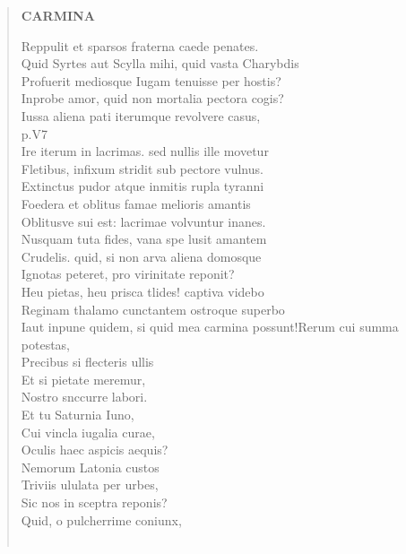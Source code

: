 \documentclass[11pt, a4paper]{report}
\begin{document}
\begin{verse}
    \begin{center} \textbf{CARMINA} \end{center} \marginpar{[62]} Reppulit et sparsos fraterna caede penates. \\ Quid Syrtes aut Scylla mihi, quid vasta Charybdis \\ Profuerit mediosque Iugam tenuisse per hostis? \\ Inprobe amor, quid non mortalia  \lbrack pectora \rbrack  cogis? \\ Iussa aliena pati iterumque revolvere casus, \\ p.V7 \\ Ire iterum in lacrimas. sed nullis ille movetur \\ Fletibus, infixum stridit sub pectore vulnus. \\ Extinctus pudor atque inmitis rupla tyranni \\ Foedera et oblitus famae melioris amantis \\ Oblitusve sui est: lacrimae volvuntur inanes. \\ Nusquam tuta fides, vana spe lusit amantem \\ Crudelis. quid, si non arva aliena domosque \\ Ignotas peteret, pro virinitate reponit? \\ Heu pietas, heu prisca tlides! captiva videbo \\ Reginam thalamo cunctantem ostroque superbo \\ Iaut inpune quidem, si quid mea carmina possunt!Rerum cui summa potestas, \\ Precibus si flecteris ullis \\ Et si pietate meremur, \\ Nostro snccurre labori. \\ Et tu Saturnia Iuno, \\ Cui vincla iugalia curae, \\ Oculis haec aspicis aequis? \\ Nemorum Latonia custos \\ Triviis ululata per urbes, \\ Sic nos in sceptra reponis? \\ Quid, o pulcherrime coniunx, \\ 
        ﻿\pagebreak 

\end{verse}
\end{document}
